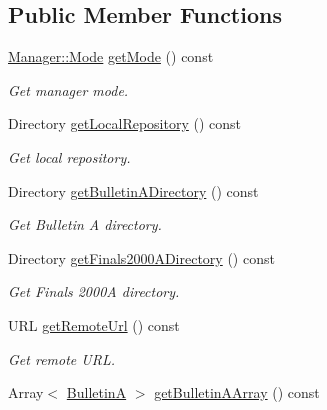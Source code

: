 \subsection*{Public Member Functions}
\begin{DoxyCompactItemize}
\item 
\hyperlink{classostk_1_1physics_1_1coord_1_1frame_1_1provider_1_1iers_1_1_manager_a3a8dd1081d1094069417687b4a3f16ba}{Manager\+::\+Mode} \hyperlink{classostk_1_1physics_1_1coord_1_1frame_1_1provider_1_1iers_1_1_manager_a00d80d91459b7d0fdac3c2dfed99d447}{get\+Mode} () const
\begin{DoxyCompactList}\small\item\em Get manager mode. \end{DoxyCompactList}\item 
Directory \hyperlink{classostk_1_1physics_1_1coord_1_1frame_1_1provider_1_1iers_1_1_manager_a0319940b293dd137109918ccbb54066a}{get\+Local\+Repository} () const
\begin{DoxyCompactList}\small\item\em Get local repository. \end{DoxyCompactList}\item 
Directory \hyperlink{classostk_1_1physics_1_1coord_1_1frame_1_1provider_1_1iers_1_1_manager_aa0e0d44ad5a33ba1b637faa3e42bb94c}{get\+Bulletin\+A\+Directory} () const
\begin{DoxyCompactList}\small\item\em Get Bulletin A directory. \end{DoxyCompactList}\item 
Directory \hyperlink{classostk_1_1physics_1_1coord_1_1frame_1_1provider_1_1iers_1_1_manager_a2d77cfbd52870e1d593077826ea194bf}{get\+Finals2000\+A\+Directory} () const
\begin{DoxyCompactList}\small\item\em Get Finals 2000A directory. \end{DoxyCompactList}\item 
U\+RL \hyperlink{classostk_1_1physics_1_1coord_1_1frame_1_1provider_1_1iers_1_1_manager_aee0fdfd01bea7d3cb6edf90d25536ca0}{get\+Remote\+Url} () const
\begin{DoxyCompactList}\small\item\em Get remote U\+RL. \end{DoxyCompactList}\item 
Array$<$ \hyperlink{classostk_1_1physics_1_1coord_1_1frame_1_1provider_1_1iers_1_1_bulletin_a}{BulletinA} $>$ \hyperlink{classostk_1_1physics_1_1coord_1_1frame_1_1provider_1_1iers_1_1_manager_a2388fb338a21c3cc707314e057323579}{get\+Bulletin\+A\+Array} () const

\end{DoxyCompactItemize}
